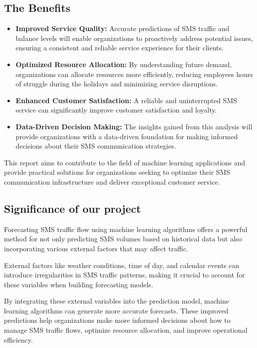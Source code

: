 \documentclass[12pt]{book} %
\begin{document}
\subsection{The Benefits}
\begin{itemize}
		\item \textbf{Improved Service Quality:} Accurate predictions of SMS traffic and balance levels will enable organizations to proactively address potential issues, ensuring a consistent and reliable service experience for their clients.
        \item \textbf{Optimized Resource Allocation:}  By understanding future demand, organizations can allocate resources more efficiently, reducing employees hours of struggle during the holidays and minimizing service disruptions.
        \item \textbf{Enhanced Customer Satisfaction:} A reliable and uninterrupted SMS service can significantly improve customer satisfaction and loyalty.
        \item \textbf{Data-Driven Decision Making:} The insights gained from this analysis will provide organizations with a data-driven foundation for making informed decisions about their SMS communication strategies.
\end{itemize}


This report aims to contribute to the field of machine learning applications and provide practical solutions for organizations seeking to optimize their SMS communication infrastructure and deliver exceptional customer service.




\subsection{Significance of our project}
Forecasting SMS traffic flow using machine learning algorithms offers a powerful method for not only predicting SMS volumes based on historical data but also incorporating various external factors that may affect traffic.

External factors like weather conditions, time of day, and calendar events can introduce irregularities in SMS traffic patterns, making it crucial to account for these variables when building forecasting models.

By integrating these external variables into the prediction model, machine learning algorithms can generate more accurate forecasts. These improved predictions help organizations make more informed decisions about how to manage SMS traffic flows, optimize resource allocation, and improve operational efficiency.
\end{document}
